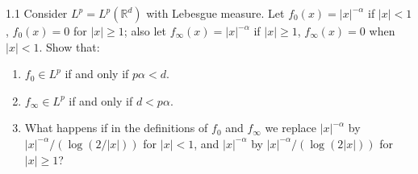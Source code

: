 \documentclass{article}
\begin{document}
\begin{prb}{1.1}
	Consider $L^{p} = L^{p}(\mathbb{R}^{d})$ with Lebesgue measure. Let $f_{0}(x) = |x|^{-\alpha}$ if $|x| < 1$, $f_{0}(x) = 0$ for $|x|\geq 1$; also let $f_{\infty}(x) = |x|^{-\alpha}$ if $|x|\geq 1$, $f_{\infty}(x) = 0$ when $|x| < 1$. Show that: \vspace{-0.25cm}
	\begin{enumerate}[itemsep =-2pt,label = (\alph{*})]
		\item $f_{0} \in L^{p}$ if and only if $p\alpha < d$. 
		\item $f_{\infty} \in L^{p}$ if and only if $d < p\alpha$. 
		\item What happens if in the definitions of $f_{0}$ and $f_{\infty}$ we replace $|x|^{-\alpha}$ by $|x|^{-\alpha}/(\log(2/|x|))$ for $|x| < 1$, and $|x|^{-\alpha}$ by $|x|^{-\alpha}/(\log(2|x|))$ for $|x|\geq 1$? 
	\end{enumerate}
\end{prb}
\end{document}
